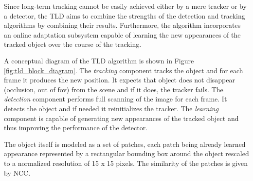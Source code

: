 Since long-term tracking cannot be easily achieved either by a mere tracker or by a detector, the TLD aims to combine the strengths of the detection and tracking algorithms by combining their results. Furthermore, the algorithm incorporates an online adaptation subsystem capable of learning the new appearances of the tracked object over the course of the tracking.

A conceptual diagram of the TLD algorithm is shown in Figure \ref{fig:tld_block_diagram}. The \textit{tracking} component tracks the object and for each frame it produces the new position. It expects that object does not disappear (occlusion, out of \gls{fov}) from the scene and if it does, the tracker fails. The \textit{detection} component performs full scanning of the image for each frame. It detects the object and if needed it reinitializes the tracker. The \textit{learning} component is capable of generating new appearances of the tracked object and thus improving the performance of the detector. 

The object itself is modeled as a set of patches, each patch being already learned appearance represented by a rectangular bounding box around the object rescaled to a normalized resolution of 15 x 15 pixels. The similarity of the patches is given by NCC.

